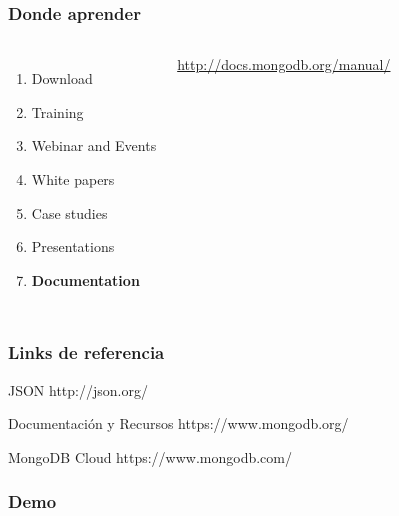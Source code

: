 \documentclass{beamer}
\begin{document}
\begin{frame}
\frametitle{Donde aprender}
\begin{columns}[c] %
\begin{enumerate}
\item Download
\item Training
\item Webinar and Events
\item White papers
\item Case studies
\item Presentations
\item \textbf{Documentation}
\end{enumerate}

{\color{blue}\url{http://docs.mongodb.org/manual/}}
\end{columns}
\end{frame}
\begin{frame}
\frametitle{Links de referencia}
\footnotesize{
\begin{thebibliography}{99} %
 JSON
\newblock http://json.org/
\end{thebibliography}
}
\footnotesize{
\begin{thebibliography}{99} %
 Documentaci\'on y Recursos
\newblock https://www.mongodb.org/
\end{thebibliography}
}
\footnotesize{
\begin{thebibliography}{99} %
 MongoDB Cloud
\newblock https://www.mongodb.com/
\end{thebibliography}
}
\end{frame}

\begin{frame}
\frametitle{Demo}

\end{frame}
\end{document}
